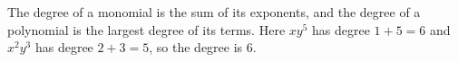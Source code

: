 The degree of a monomial is the sum of its exponents, and the degree of a polynomial is the largest degree of its terms. Here $xy^5$ has degree $1+5=6$ and $x^2y^3$ has degree $2+3=5$, so the degree is $\boxed{6}$.
